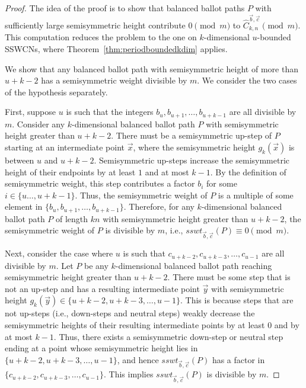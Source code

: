 \documentclass[11pt]{article}
\theoremstyle{remark}
\theoremstyle{definition}
\begin{document}
\begin{proof}
The idea of the proof is to show that balanced ballot paths $P$ with sufficiently large semisymmetric height contribute $0 \pmod{m}$ to $\widehat{C}_{k, n}^{\vec{b}, \vec{c}} \pmod{m}$. This computation reduces the problem to the one on $k$-dimensional $u$-bounded SSWCNs, where Theorem~\ref{thm:periodboundedkdim} applies. 

We show that any balanced ballot path with semisymmetric height of more than $u+k-2$ has a semisymmetric weight divisible by $m$. We consider the two cases of the hypothesis separately. 

First, suppose $u$ is such that the integers $b_u, b_{u+1}, \dots, b_{u+k-1}$ are all divisible by $m$. Consider any $k$-dimensional balanced ballot path $P$ with semisymmetric height greater than $u+k-2$. There must be a semisymmetric up-step of $P$ starting at an intermediate point $\vec{x}$, where the semisymmetric height $g_k(\vec{x})$ is between $u$ and $u+k-2$. Semisymmetric up-steps increase the semisymmetric height of their endpoints by at least $1$ and at most $k-1$. By the definition of semisymmetric weight, this step contributes a factor $b_i$ for some $i\in\{u\dots,u+k-1\}$. Thus, the semisymmetric weight of $P$ is a multiple of some element in $\{b_u, b_{u+1}, \dots, b_{u+k-1}\}$. Therefore, for any $k$-dimensional balanced ballot path $P$ of length $kn$ with semisymmetric height greater than $u+k-2$, the semisymmetric weight of $P$ is divisible by $m$, i.e., $sswt_{\vec{b}, \vec{c}}(P) \equiv 0 \pmod{m}$.

Next, consider the case where $u$ is such that $c_{u+k-2}, c_{u+k-3}, \dots, c_{u-1}$ are all divisible by $m$. Let $P$ be any $k$-dimensional balanced ballot path reaching semisymmetric height greater than $u+k-2$. There must be some step that is not an up-step and has a resulting intermediate point $\vec{y}$ with semisymmetric height $g_k(\vec{y}) \in \{u+k-2, u+k-3, \dots, u-1\}$. This is because steps that are not up-steps (i.e., down-steps and neutral steps) weakly decrease the semisymmetric heights of their resulting intermediate points by at least $0$ and by at most $k-1$. Thus, there exists a semisymmetric down-step or neutral step ending at a point whose semisymmetric height lies in $\{u+k-2, u+k-3, \dots, u-1\}$, and hence $sswt_{\vec{b}, \vec{c}}(P)$ has a factor in $\{c_{u+k-2}, c_{u+k-3}, \dots, c_{u-1}\}$. This implies $sswt_{\vec{b}, \vec{c}}(P)$ is divisible by $m$. 


\end{proof}
\end{document}
